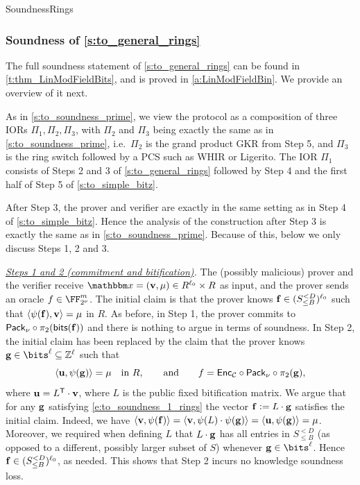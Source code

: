 \begin{lncsmove}{SoundnessRings}
\subsubsection{Soundness of \cref{s:to_general_rings}}\label{s:to_soundness_rings}\iflncs\label{s:to_soundness}\fi

The full soundness statement of \cref{s:to_general_rings} can be found in \cref{t:thm_LinModFieldBits}, and is proved in \cref{a:LinModFieldBin}. We provide an overview of it next.

As in \cref{s:to_soundness_prime}, we view the protocol as a composition of three IORs $\Pi_1, \Pi_2, \Pi_3$, with $\Pi_2$ and $\Pi_3$ being exactly the same as in \cref{s:to_soundness_prime}, i.e.\ $\Pi_2$ is the grand product GKR from Step 5, and $\Pi_3$ is the ring switch followed by a PCS  such as WHIR or Ligerito.  The IOR $\Pi_1$ consists of Steps 2 and 3 of \cref{s:to_general_rings} followed by Step 4 and the first half of Step 5 of \cref{s:to_simple_bitz}.

After Step 3, the prover and verifier are exactly in the same setting as in Step 4 of \cref{s:to_simple_bitz}. Hence the analysis of the construction after Step 3 is exactly the same as in \cref{s:to_soundness_prime}.  Because of this, below we only discuss Steps 1, 2 and 3.

\bigskip

\noindent\emph{\underline{Steps 1 and 2 (commitment and bitification)}.} The (possibly malicious) prover and the verifier receive $\inp=(\vv,\mu)\in R^{\codedim_0}\times R$ as input, and the prover sends an oracle $f\in \comfield^{\codelength}$. The initial claim is that the prover knows $\mathbf{f}\in (S_{\leq B}^{<D})^{\ell_0}$ such that $\langle \psi(\mathbf{f}), \mathbf{v}\rangle = \mu$ in $R$. As before, in Step 1, the prover commits to $\mathsf{Pack}_\nu\circ \pi_2(\mathsf{bits}(\mathbf{f}))$ and there is nothing to argue in terms of soundness. In Step 2, the initial claim has been replaced by the claim that the prover knows $\bfg\in \bits^{\codedim}\subseteq \ZZ^\codedim$ such that
%
\begin{equation}\label{e:to_soundness_1_rings}
\langle \mathbf{u}, \psi(\mathbf{g})\rangle = \mu \quad \text{in } R, \qquad \text{and} \qquad f= \mathsf{Enc}_{\mathcal{C}} \circ \mathsf{Pack}_\nu\circ \pi_2(\mathbf{g}),
\end{equation}
where $\mathbf{u}=L^{\mathsf{T}}\cdot \mathbf{v}$, where $L$ is the public fixed bitification matrix. We argue that for any $\mathbf{g}$ satisfying \eqref{e:to_soundness_1_rings} the vector  $\mathbf{f}{\;\vcentcolon=\;} L \cdot \mathbf{g}$ satisfies the initial claim. Indeed, we have $\langle \mathbf{v}, \psi(\mathbf{f})\rangle = \langle \mathbf{v}, \psi(L)\cdot \psi(\mathbf{g})\rangle = \langle \mathbf{u}, \psi(\mathbf{g})\rangle  = \mu$. Moreover, we required when defining $L$ that $L\cdot \mathbf{g}$ has all entries in $S_{\leq B}^{<D}$  (as opposed to a different, possibly larger subset of $S$)  whenever $\bfg\in \bits^{\codedim}$. Hence  $\mathbf{f}\in (S_{\leq B}^{<D})^{\ell_0}$, as needed.  This shows that Step 2 incurs no knowledge soundness loss.


\end{lncsmove}
